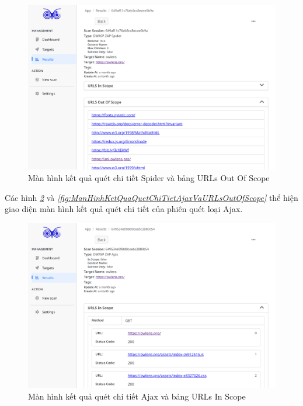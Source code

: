 \begin{figure}[H]
      \centering
      \includegraphics[width=\textwidth]{applied-thesis-chapters/chapter-6/Màn hình kết quả quét chi tiết Spider và bảng URLs Out Of Scope.png}
      \caption{Màn hình kết quả quét chi tiết Spider và bảng URLs Out Of Scope}
      \label{fig:ManHinhKetQuaQuetChiTietSpiderVaURLsOutOfScope}
\end{figure}

Các hình \textit{\ref{fig:ManHinhKetQuaQuetChiTietAjaxVaURLsInScope} } 
và \textit{\ref{fig:ManHinhKetQuaQuetChiTietAjaxVaURLsOutOfScope} } 
thể hiện giao diện màn hình kết quả quét chi tiết của phiên quét loại Ajax.

\begin{figure}[H]
      \centering
      \includegraphics[width=\textwidth]{applied-thesis-chapters/chapter-6/Màn hình kết quả quét chi tiết Ajax và bảng URLs In Scope.png}
      \caption{Màn hình kết quả quét chi tiết Ajax và bảng URLs In Scope}
      \label{fig:ManHinhKetQuaQuetChiTietAjaxVaURLsInScope}
\end{figure}

